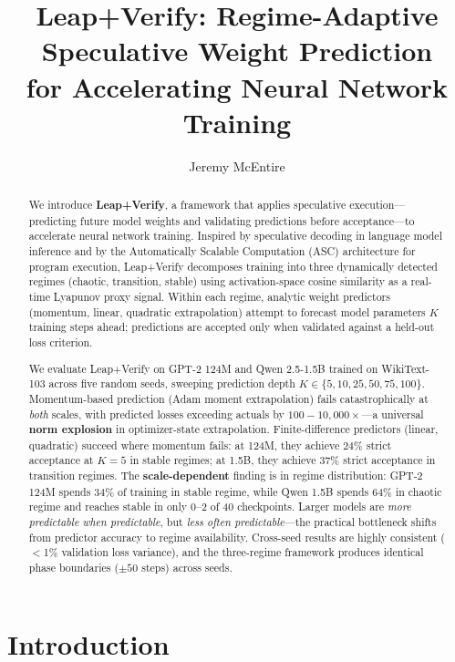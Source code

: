 \documentclass{article}
\title{Leap+Verify: Regime-Adaptive Speculative Weight Prediction\\for Accelerating Neural Network Training}
\author{Jeremy McEntire}
\date{}
\begin{document}
\maketitle

\begin{abstract}
We introduce \textbf{Leap+Verify}, a framework that applies speculative execution---predicting future model weights and validating predictions before acceptance---to accelerate neural network training.
Inspired by speculative decoding in language model inference and by the Automatically Scalable Computation (ASC) architecture for program execution, Leap+Verify decomposes training into three dynamically detected regimes (chaotic, transition, stable) using activation-space cosine similarity as a real-time Lyapunov proxy signal.
Within each regime, analytic weight predictors (momentum, linear, quadratic extrapolation) attempt to forecast model parameters $K$ training steps ahead; predictions are accepted only when validated against a held-out loss criterion.

We evaluate Leap+Verify on GPT-2 124M and Qwen 2.5-1.5B trained on WikiText-103 across five random seeds, sweeping prediction depth $K \in \{5, 10, 25, 50, 75, 100\}$.
Momentum-based prediction (Adam moment extrapolation) fails catastrophically at \emph{both} scales, with predicted losses exceeding actuals by $100{-}10{,}000\times$---a universal \textbf{norm explosion} in optimizer-state extrapolation.
Finite-difference predictors (linear, quadratic) succeed where momentum fails: at 124M, they achieve 24\% strict acceptance at $K{=}5$ in stable regimes; at 1.5B, they achieve 37\% strict acceptance in transition regimes.
The \textbf{scale-dependent} finding is in regime distribution: GPT-2 124M spends 34\% of training in stable regime, while Qwen 1.5B spends 64\% in chaotic regime and reaches stable in only 0--2 of 40 checkpoints.
Larger models are \emph{more predictable when predictable}, but \emph{less often predictable}---the practical bottleneck shifts from predictor accuracy to regime availability.
Cross-seed results are highly consistent ($<$1\% validation loss variance), and the three-regime framework produces identical phase boundaries ($\pm 50$ steps) across seeds.
\end{abstract}

\section{Introduction}
\label{sec:intro}
\end{document}
